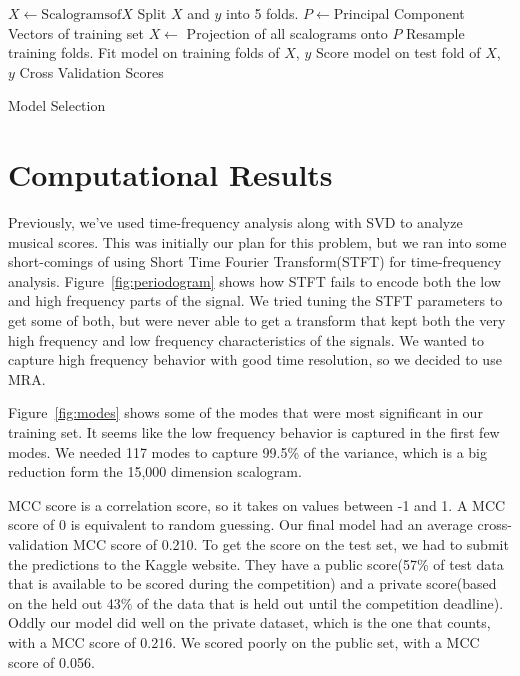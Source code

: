 \documentclass{article}
\begin{document}
\begin{algorithm}
    \begin{algorithmic}
        \STATE $X \leftarrow \mathrm{Scalograms of} X$
        \STATE Split $X$ and $y$ into 5 folds.
            \STATE $P \leftarrow$Principal Component Vectors of training
            set
            \STATE $X \leftarrow$ Projection of all scalograms onto $P$
            \STATE Resample training folds.
            \STATE Fit model on training folds of $X$, $y$
            \STATE Score model on test fold of $X$, $y$
        \ENDFOR
        \RETURN Cross Validation Scores
    \end{algorithmic}
    \caption{Model Selection}
    \label{alg:crossval}
\end{algorithm}


\section{Computational Results}
Previously, we've used time-frequency analysis along with SVD to analyze musical
scores\cite{hw4b}. This was initially our plan for this problem, but we ran into
some short-comings of using Short Time Fourier Transform(STFT) for
time-frequency analysis. Figure~\ref{fig:periodogram} shows how STFT fails to
encode both the low and high frequency parts of the signal. We tried tuning the
STFT parameters to get some of both, but were never able to get a transform that
kept both the very high frequency and low frequency characteristics of the
signals. We wanted to capture high frequency behavior with good time resolution,
so we decided to use MRA.

Figure~\ref{fig:modes} shows some of the modes that were most significant in our
training set. It seems like the low frequency behavior is captured in the first
few modes. We needed 117 modes to capture 99.5\% of the variance, which is a big
reduction form the 15,000 dimension scalogram.

MCC score is a correlation score, so it takes on values between -1 and 1. A MCC
score of 0 is equivalent to random guessing. Our final model had an average
cross-validation MCC score of 0.210.
To get the score on the test set, we had to submit the predictions to the Kaggle
website. They have a public score(57\% of test data that is available to be
scored during the competition) and a private score(based on the held out 43\% of
the data that is held out until the competition deadline). Oddly our model did
well on the private dataset, which is the one that counts, with a MCC score of
0.216. We scored poorly on the public set, with a MCC score of 0.056.
\end{document}
